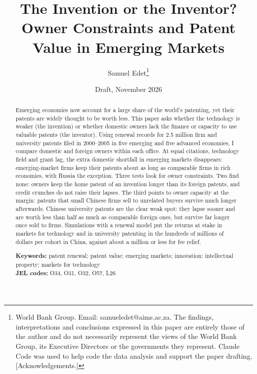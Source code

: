 \documentclass[11pt]{article}
\title{\textbf{The Invention or the Inventor?\\Owner Constraints and Patent Value in Emerging Markets}}
\author{Samuel Edet\thanks{World Bank Group. Email: samueledet@aims.ac.za. The findings, interpretations and
conclusions expressed in this paper are entirely those of the author and do not necessarily represent the views of
the World Bank Group, its Executive Directors or the governments they represent. Claude Code was used to help code
the data analysis and support the paper drafting. [Acknowledgements.]}}
\date{Draft, November 2026}
\begin{document}
\maketitle
\thispagestyle{empty}

\begin{abstract}
\noindent Emerging economies now account for a large share of the world's patenting, yet their patents are widely
thought to be worth less. This paper asks whether the technology is weaker (the invention) or whether domestic owners
lack the finance or capacity to use valuable patents (the inventor). Using renewal records for 2.5 million firm and
university patents filed in 2000--2005 in five emerging and five advanced economies, I compare domestic and foreign
owners within each office. At equal citations, technology field and grant lag, the extra domestic shortfall in
emerging markets disappears: emerging-market firms keep their patents about as long as comparable firms in rich
economies, with Russia the exception. Three tests look for owner constraints. Two find none: owners keep the home
patent of an invention longer than its foreign patents, and credit crunches do not raise their lapses. The third
points to owner capacity at the margin: patents that small Chinese firms sell to unrelated buyers survive much longer
afterwards. Chinese university patents are the clear weak spot: they lapse sooner and are worth less than half as
much as comparable foreign ones, but survive far longer once sold to firms. Simulations with a renewal model put the
returns at stake in markets for technology and in university patenting in the hundreds of millions of dollars per
cohort in China, against about a million or less for fee relief.

\medskip
\noindent\textbf{Keywords:} patent renewal; patent value; emerging markets; innovation; intellectual property;
markets for technology\\
\noindent\textbf{JEL codes:} O34, O31, O32, O57, L26
\end{abstract}

\newpage
\setcounter{page}{1}







\newpage 



\newpage
\appendix

\end{document}
